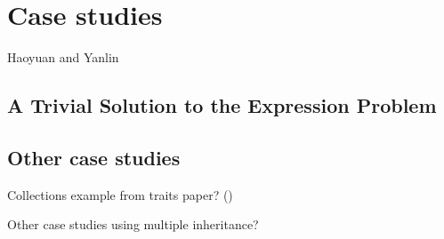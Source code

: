 \section{Case studies}
Haoyuan and Yanlin

\subsection{A Trivial Solution to the Expression Problem}


\subsection{Other case studies}

Collections example from traits paper?
()

Other case studies using multiple inheritance?
